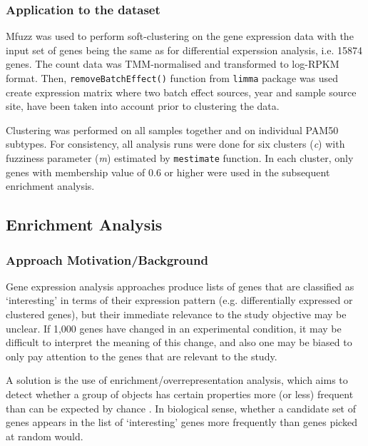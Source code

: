 \subsubsection{Application to the dataset}

Mfuzz was used to perform soft-clustering on the gene expression data with the input set of genes being the same as for differential experssion analysis, i.e. 15874 genes. The count data was TMM-normalised and transformed to log-RPKM format. Then, \texttt{removeBatchEffect()} function from \texttt{limma} package \cite{Ritchie2015LimmaStudies} was used create expression matrix where two batch effect sources, year and sample source site, have been taken into account prior to clustering the data. 

Clustering was performed on all samples together and on individual PAM50 subtypes. For consistency, all analysis runs were done for six clusters (\textit{c})  with fuzziness parameter (\textit{m}) estimated by \texttt{mestimate} function. In each cluster, only genes with membership value of 0.6 or higher were used in the subsequent enrichment analysis. 





    \newpage
    \subsection{Enrichment Analysis}
    
    
      \subsubsection{Approach Motivation/Background}
        Gene expression analysis approaches produce lists of genes that are classified as ‘interesting’ in terms of their expression pattern (e.g. differentially expressed or clustered genes), but their immediate relevance to the study objective may be unclear. If 1,000 genes have changed in an experimental condition, it may be difficult to interpret the meaning of this change, and also one may be biased to only pay attention to the genes that are relevant to the study. 

        A solution is the use of enrichment/overrepresentation analysis, which aims to detect whether a group of objects has certain properties more (or less) frequent than can be expected by chance \cite{Goeman2007AnalyzingIssues}. In biological sense, whether a candidate set of genes appears in the list of ‘interesting’ genes more frequently than genes picked at random would. 

